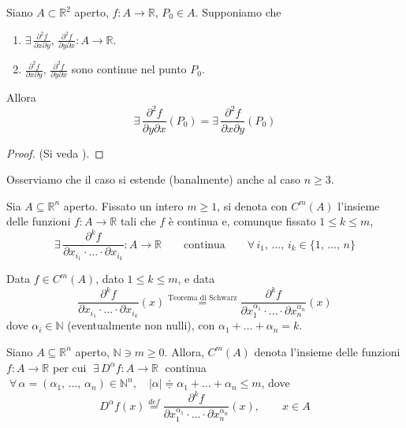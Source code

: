 \begin{thm}
Siano $A \subset \mathbb{R}^2$ aperto, $f : A \longrightarrow \mathbb{R}$, $P_0 \in A$. Supponiamo che
\begin{enumerate}[labelindent=\parindent,leftmargin=*,label=\textnormal{(\roman*)},start=1]
\item $\displaystyle \exists \, \frac{\partial^2 f}{\partial x \partial y},\,\frac{\partial^2 f}{\partial y \partial x} : A \longrightarrow \mathbb{R}$.
\item $\displaystyle \frac{\partial^2 f}{\partial x \partial y},\,\frac{\partial^2 f}{\partial y \partial x}$ sono continue nel punto $P_0$.
\end{enumerate}
Allora
$$ \exists \, \frac{\partial^2 f}{\partial y \partial x}(P_0) = \exists \, \frac{\partial^2 f}{\partial x \partial y}(P_0)$$
\end{thm}
\begin{proof}
(Si veda \cite{Giusti2003}).
\end{proof}

Osserviamo che il caso si estende (banalmente) anche al caso $n \geq 3$.

\begin{definition}
Sia $A \subseteq \mathbb{R}^n$ aperto. Fissato un intero $m \geq 1$, si denota con $C^m(A)$ l'insieme delle funzioni $f : A \longrightarrow \mathbb{R}$ tali che $f$ è continua e, comunque fissato $1 \leq k \leq m$,
$$
\exists \, \frac{\partial^k f}{\partial x_{i_1} \cdot \ldots \cdot \partial x_{i_k}} : A \longrightarrow \mathbb{R} \qquad \text{continua} \qquad \forall \, i_1,\,\ldots,\,i_k \in \lbrace 1,\,\ldots,\,n \rbrace
$$
\end{definition}

\begin{obs}[importante]
Data $f \in C^m(A)$, dato $1 \leq k \leq m$, e data
$$
\frac{\partial^k f}{\partial x_{i_1} \cdot \ldots \cdot \partial x_{i_k}}(x)
\overset{\text{Teorema di Schwarz}}{=}
\frac{\partial^k f}{\partial x_1^{\alpha_1} \cdot \ldots \cdot \partial x_n^{\alpha_n}}(x)
$$
dove $\alpha_i \in \mathbb{N}$ (eventualmente non nulli), con $\alpha_1+\ldots+\alpha_n=k$.
\end{obs}

\begin{definition}
Siano $A \subseteq \mathbb{R}^n$ aperto, $\mathbb{N} \ni m \geq 0$. Allora, $C^m(A)$ denota l'insieme delle funzioni $f: A \longrightarrow \mathbb{R}$ per cui $\; \exists \, D^\alpha f : A \longrightarrow \mathbb{R} \;$ continua $\; \forall \, \alpha = (\alpha_1,\,\ldots,\,\alpha_n) \in \mathbb{N}^n, \quad |\alpha| \doteqdot \alpha_1 + \ldots + \alpha_n \leq m$, dove
$$
D^\alpha f(x) \overset{def}{=} \frac{\partial^k f}{\partial x_1^{\alpha_1} \cdot \ldots \cdot \partial x_n^{\alpha_n}}(x), \qquad x \in A
$$
\end{definition}




